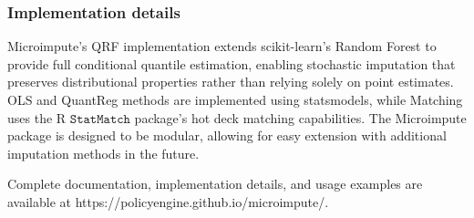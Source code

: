 \subsubsection{Implementation details}

Microimpute's QRF implementation extends scikit-learn's Random Forest to provide full conditional quantile estimation, enabling stochastic imputation that preserves distributional properties rather than relying solely on point estimates. OLS and QuantReg methods are implemented using statsmodels, while Matching uses the R $\texttt{StatMatch}$ package's hot deck matching capabilities. The Microimpute package is designed to be modular, allowing for easy extension with additional imputation methods in the future.

Complete documentation, implementation details, and usage examples are available at https://policyengine.github.io/microimpute/.